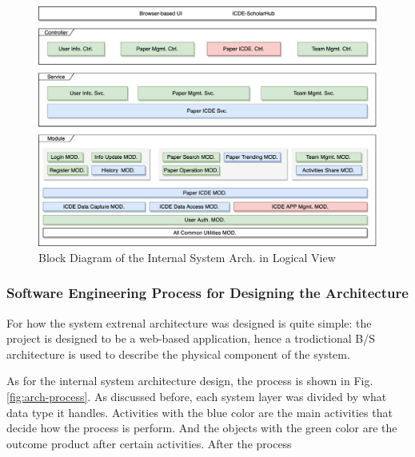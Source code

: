 \documentclass[conference]{IEEEtran}
\begin{document}
\begin{figure}[!ht]
	\centering
	\includegraphics[scale=0.082]{sys-arch.png}
	\caption{Block Diagram of the Internal System Arch\protect\footnotemark[5]\protect\footnotemark[6]. in Logical View}
	\label{fig:sys-arch}
\end{figure}


\subsubsection{\textbf{Software Engineering Process for Designing the Architecture}}
\label{sec:1.1.2}

For how the system extrenal architecture was designed is quite simple: the project is designed to be a
web-based application, hence a trodictional B/S architecture is used to describe the
physical component of the system.

As for the internal system architecture design, the process is shown in Fig. \ref{fig:arch-process}.
As discussed before, each system layer was divided by what data type it handles.
Activities with the blue color are the main activities that decide how the process is perform.
And the objects with the green color are the outcome product after certain activities. After the process
\end{document}
